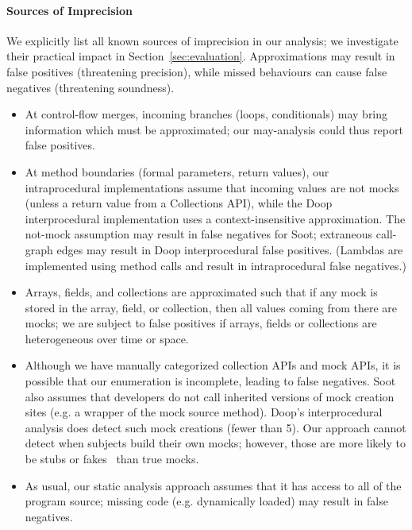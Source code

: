 \paragraph{Sources of Imprecision}
We explicitly list all known sources of imprecision in our analysis; we investigate their practical impact in Section~\ref{sec:evaluation}.
Approximations may result in false positives (threatening precision), while missed behaviours can cause false negatives (threatening soundness).
\begin{itemize}[noitemsep]
\item At control-flow merges, incoming branches (loops, conditionals) may bring information which must be approximated; our may-analysis could thus report false positives.
\item At method boundaries (formal parameters, return values), our intraprocedural implementations assume that incoming values are not mocks (unless a return value from a Collections API), while the Doop interprocedural implementation uses a context-insensitive approximation. The not-mock assumption may result in false negatives for Soot; extraneous call-graph edges may result in Doop interprocedural false positives. (Lambdas are implemented using method calls and result in intraprocedural false negatives.)
\item Arrays, fields, and collections are approximated such that if any mock is stored in the array, field, or collection, then all values coming from there are mocks; we are subject to false positives if arrays, fields or collections are heterogeneous over time or space.
\item Although we have manually categorized collection APIs and mock APIs, it is possible that our enumeration is incomplete, leading to false negatives.
  Soot also assumes that developers do not call inherited versions of mock creation sites (e.g. a wrapper of the mock source method). Doop's interprocedural analysis does detect such mock creations (fewer than 5).
  Our approach cannot detect when subjects build their own mocks; however, those are more likely to be stubs or fakes~\cite{fowler07:_mocks_arent_stubs} than true mocks. 
  \item As usual, our static analysis approach assumes that it has access to all of the program source; missing code (e.g. dynamically loaded) may result in false negatives.
\end{itemize}


